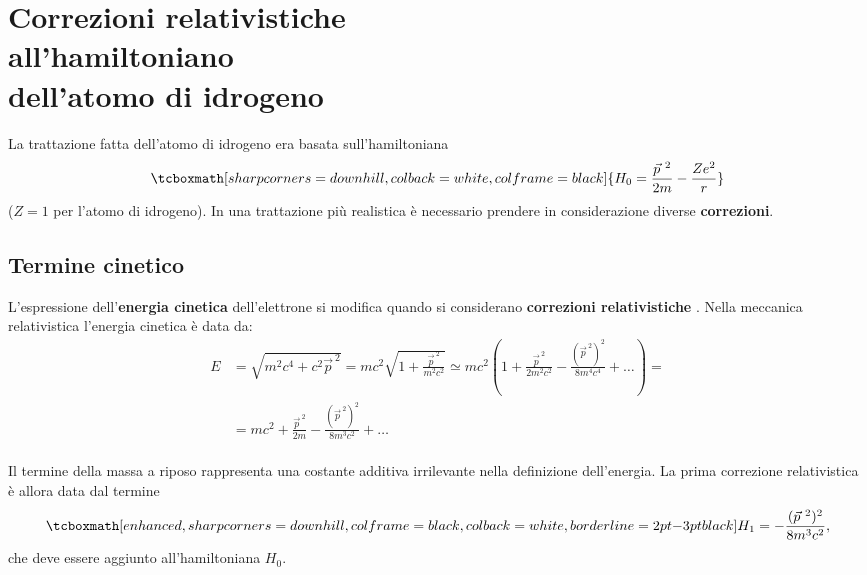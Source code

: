 \chapter[Correzioni relativistiche all'atomo di idrogeno]{Correzioni relativistiche\\ all'hamiltoniano\\ dell'atomo di idrogeno}

La trattazione fatta dell'atomo di idrogeno era basata sull'hamiltoniana
	\begin{equation}
	\label{eq:cap25_1}
		\tcboxmath[sharp corners=downhill, colback=white, colframe=black]{
			H_0=\frac{\vec{p}^{\ 2}}{2m}-\frac{Z e^2}{r}
			}
\end{equation}
($Z=1$ per l'atomo di idrogeno). In una trattazione più realistica è necessario prendere in considerazione diverse \textbf{correzioni}.

\section{Termine cinetico}

L'espressione dell'\textbf{energia cinetica} dell'elettrone si modifica quando si considerano \textbf{correzioni relativistiche }. Nella meccanica relativistica l'energia cinetica è data da:
	\begin{align} 
		E & =  \sqrt{m^2c^4+c^2\vec{p}^{\ 2}}= mc^2 \sqrt{1+ \frac{\vec{p}^{\ 2}}{m^2c^2}} \simeq  mc^2 \left( 1+ \frac{\vec{p}^{\ 2}}{2m^2c^2}-\frac{(\vec{p}^{\ 2})^2}{8m^4c^4}+\dots \right) = \nonumber  \\
		& =  mc^2+\frac{\vec{p}^{\ 2}}{2m}-\frac{(\vec{p}^{\ 2})^2}{8m^3c^2}+ \dots 
	\end{align}\\
	
Il termine della massa a riposo rappresenta una costante additiva irrilevante nella definizione dell'energia. La prima correzione relativistica è allora data dal termine 
	\begin{equation}
	\label{eq:cap25_2}
		\tcboxmath[enhanced, sharp corners=downhill, colframe=black, colback=white, borderline={2pt}{-3pt}{black}]{
			H_1=-\frac{(\vec{p}^{\ 2})^2}{8m^3c^2} ,
			}
	\end{equation}
che deve essere aggiunto all'hamiltoniana $H_0$. \\

